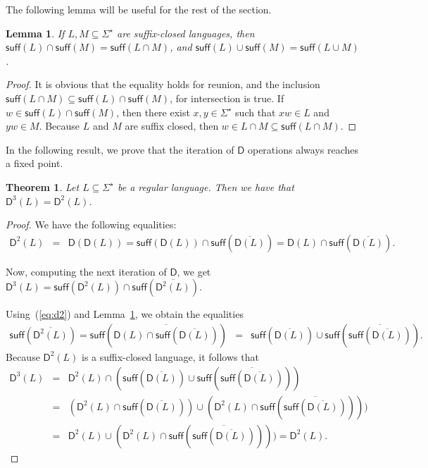 \documentclass{article}
\newtheorem{lemma}{Lemma}
\newtheorem{theorem}{Theorem}
\newcommand{\comp}[1]{\overline{#1}}
\newcommand{\suff}[1]{\mathsf{suff}(#1)}
\newcommand{\dis}[1]{\mathsf{D}(#1)}
\newcommand{\diso}{\mathsf{D}}
\newcommand{\disn}[2]{\mathsf{D}^{#2}(#1)}
\newcommand{\kleene}[1]{#1^\star}
\begin{document}
The following lemma will be useful for the rest of the section.

\begin{lemma}
\label{lsufcap}
 If $L,M\subseteq \Sigma^\star$ are suffix-closed languages, then
$\suff{L}\cap\suff{M}=\suff{L\cap M}$, and 
$\suff{L}\cup\suff{M}=\suff{L\cup M}$.
\end{lemma}
\begin{proof}
It is obvious that the equality holds for reunion, and  
the inclusion $\suff{L\cap M}\subseteq \suff{L}\cap\suff{M}$, for intersection is true.
If $w\in \suff{L}\cap\suff{M}$, then
there exist $x,y\in \Sigma^\star$ such that $xw\in L$ and $yw\in M$. 
Because $L$ and $M$ are suffix closed, then
$w\in L\cap M\subseteq \suff{L\cap M}.$
\end{proof}

In the following result, we prove that the iteration of $\diso$
operations always reaches a fixed point. 

\begin{theorem}
\label{theo:fixpoint}
Let $L\subseteq \kleene{\Sigma}$ be a regular language. 
Then we have that  
  $\disn{L}{3}=\disn{L}{2}$.
\end{theorem}

\begin{proof}
We have the following equalities:
\begin{eqnarray}
\label{eq:d2}
  \disn{L}{2}&=&\dis{\dis{L}}=\suff{\dis{L}}\cap
  \suff{\comp{\dis{L}}}= \dis{L}\cap 
  \suff{\comp{\dis{L}}}.
   \end{eqnarray}
  
Now, computing the next iteration of $\diso$, we get
 $\disn{L}{3}=\suff{\disn{L}{2}}\cap  \suff{\comp{\disn{L}{2}}}$.

Using~(\ref{eq:d2}) and Lemma~\ref{lsufcap},  we obtain the equalities
\begin{eqnarray*}
\suff{\comp{\disn{L}{2}}}=\suff{\comp{\dis{L}\cap\suff{\comp{\dis{L}}}}}&=&
  \suff{\comp{\dis{L}}}\cup  \suff{\comp{\suff{\comp{\dis{L}}}}}.
\end{eqnarray*}
Because $\disn{L}{2}$ is a suffix-closed language, it follows that
\begin{eqnarray*}
\disn{L}{3} & = & \disn{L}{2}\cap (\suff{\comp{\dis{L}}}\cup \suff{\comp{\suff{\comp{\dis{L}}}}}) \\
            & = & (\disn{L}{2}\cap \suff{\comp{\dis{L}}})\cup (\disn{L}{2}\cap \suff{\comp{\suff{\comp{\dis{L}}}}}))\\
            & = & \disn{L}{2}\cup (\disn{L}{2}\cap \suff{\comp{\suff{\comp{\dis{L}}}}}))=\disn{L}{2}.
\end{eqnarray*}
\end{proof}
\end{document}
